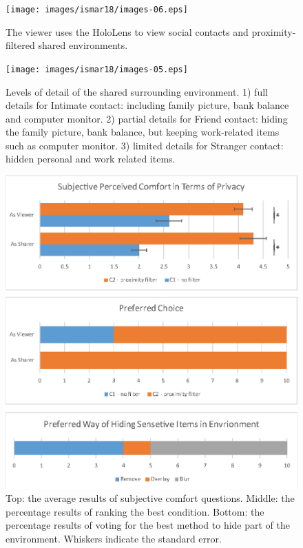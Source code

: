 \begin{figure}
    \centering
    \texttt{[image: images/ismar18/images-06.eps]}
    \caption{The viewer uses the HoloLens to view social contacts and proximity-filtered shared environments.}
    \label{fig:environment:setup}
\end{figure}

\begin{figure}[ht]
  \centering
  \texttt{[image: images/ismar18/images-05.eps]}
  \caption{Levels of detail of the shared surrounding environment. 1) full details for Intimate contact: including family picture, bank balance and computer monitor. 2) partial details for Friend contact: hiding the family picture, bank balance, but keeping work-related items such as computer monitor. 3) limited details for Stranger contact: hidden personal and work related items.}
  \label{fig:environment:environment-levels}
\end{figure}

\begin{figure}[t]
  \centering
  \includegraphics[width=\columnwidth]{images/ismar18/images-04.eps}
  \caption{Top: the average results of subjective comfort questions. Middle: the percentage results of ranking the best condition. Bottom: the percentage results of voting for the best method to hide part of the environment. Whiskers indicate the standard error.}
  \label{fig:environment:results}
\end{figure}


